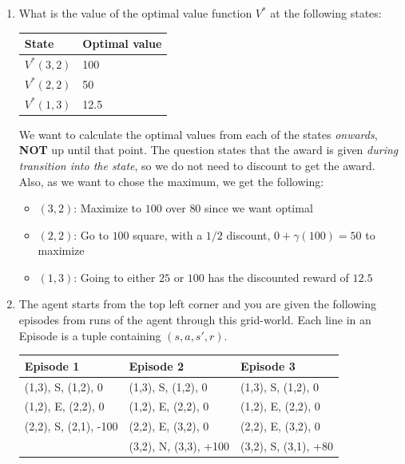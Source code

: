 \documentclass[12pt]{article}
\begin{document}
\begin{enumerate}

\item What is the value of the optimal value function $V^*$ at the following states:
  
  \begin{center}\begin{tabular}{|l|l|} \hline
  \bf State  & \bf Optimal value \\ \hline
  $V^*(3,2)$ & 100\\
  $V^*(2,2)$ & 50\\
  $V^*(1,3)$ & 12.5\\ \hline
  \end{tabular}\end{center}

We want to calculate the optimal values from each of the states {\em onwards}, {\bf NOT} up until that point. The question states that the award is given {\em during transition into the state}, so we do not need to discount to get the award. Also, as we want to chose the maximum, we get the following:

\begin{itemize}
  \item $(3,2)$: Maximize to $100$ over $80$ since we want optimal
  \item $(2,2)$: Go to $100$ square, with a $1/2$ discount, $0 + \gamma(100) = 50$ to maximize
  \item $(1,3)$: Going to either $25$ or $100$ has the discounted reward of $12.5$
\end{itemize}

\item The agent starts from the top left corner and you are given the
  following episodes from runs of the agent through this
  grid-world. Each line in an Episode is a tuple containing $(s, a,
  s', r)$.

\begin{table}[htb!]
  \centering
\begin{tabular}{l|l|l}
Episode 1 & Episode 2 & Episode 3\\
\hline
(1,3), S, (1,2), 0 & (1,3), S, (1,2), 0 & (1,3), S, (1,2), 0 \\
(1,2), E, (2,2), 0 & (1,2), E, (2,2), 0 & (1,2), E, (2,2), 0 \\
(2,2), S, (2,1), -100 & (2,2), E, (3,2), 0 & (2,2), E, (3,2), 0 \\ 
  & (3,2), N, (3,3), +100 & (3,2), S, (3,1), +80 \\ 
 \hline
\end{tabular}
\end{table}


\end{enumerate}
\end{document}
